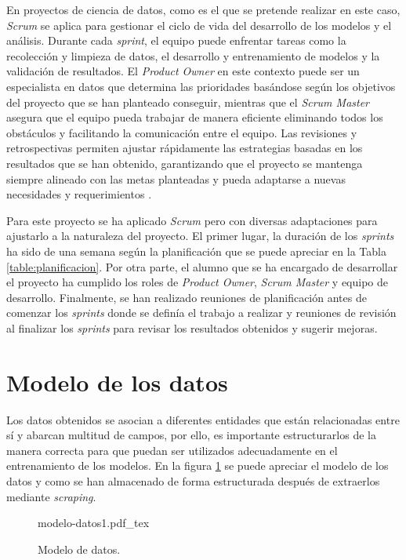 En proyectos de ciencia de datos, como es el que se pretende realizar en este caso, \textit{Scrum} se aplica para gestionar el ciclo de vida del desarrollo de los modelos y el análisis. Durante cada \textit{sprint}, el equipo puede enfrentar tareas como la recolección y limpieza de datos, el desarrollo y entrenamiento de modelos y la validación de resultados. El \textit{Product Owner} en este contexto puede ser un especialista en datos que determina las prioridades basándose según los objetivos del proyecto que se han planteado conseguir, mientras que el \textit{Scrum Master} asegura que el equipo pueda trabajar de manera eficiente eliminando todos los obstáculos y facilitando la comunicación entre el equipo. Las revisiones y retrospectivas permiten ajustar rápidamente las estrategias basadas en los resultados que se han obtenido, garantizando que el proyecto se mantenga siempre alineado con las metas planteadas y pueda adaptarse a nuevas necesidades y requerimientos \cite{scrum-data-science}.

Para este proyecto se ha aplicado \textit{Scrum} pero con diversas adaptaciones para ajustarlo a la naturaleza del proyecto. El primer lugar, la duración de los \textit{sprints} ha sido de una semana según la planificación que se puede apreciar en la Tabla \ref{table:planificacion}. Por otra parte, el alumno que se ha encargado de desarrollar el proyecto ha cumplido los roles de \textit{Product Owner}, \textit{Scrum Master} y equipo de desarrollo. Finalmente, se han realizado reuniones de planificación antes de comenzar los \textit{sprints} donde se definía el trabajo a realizar y reuniones de revisión al finalizar los \textit{sprints} para revisar los resultados obtenidos y sugerir mejoras.


\section{Modelo de los datos}
Los datos obtenidos se asocian a diferentes entidades que están relacionadas entre sí y abarcan multitud de campos, por ello, es importante estructurarlos de la manera correcta para que puedan ser utilizados adecuadamente en el entrenamiento de los modelos. En la figura \ref{fig:modelo-datos} se puede apreciar el modelo de los datos y como se han almacenado de forma estructurada después de extraerlos mediante \textit{scraping}.

\begin{figure}
    \centering
    \begin{normalsize}
        {modelo-datos1.pdf_tex}
    \end{normalsize}
    \caption{Modelo de datos.}
    \label{fig:modelo-datos}

\end{figure}


